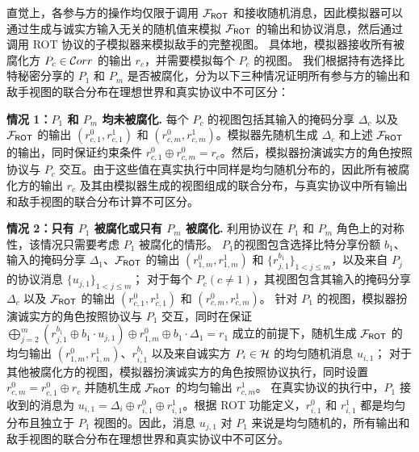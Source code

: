 \begin{trivlist}
直觉上，各参与方的操作均仅限于调用 $\mathcal{F}_\mathsf{ROT}$ 和接收随机消息，因此模拟器可以通过生成与诚实方输入无关的随机值来模拟 $\mathcal{F}_\mathsf{ROT}$ 的输出和协议消息，然后通过调用 ROT 协议的子模拟器来模拟敌手的完整视图。
具体地，模拟器接收所有被腐化方 $P_c \in \mathcal{C}orr$ 的输出 $r_c$，并需要模拟每个 $P_c$ 的视图。
我们根据持有选择比特秘密分享的 $P_1$ 和 $P_m$ 是否被腐化，分为以下三种情况证明所有参与方的输出和敌手视图的联合分布在理想世界和真实协议中不可区分：

\textbf{情况 1：$P_1$ 和 $P_m$ 均未被腐化.}
每个 $P_c$ 的视图包括其输入的掩码分享 $\Delta_c$ 以及 $\mathcal{F}_\mathsf{ROT}$ 的输出 $(r_{c,1}^0, r_{c,1}^1)$ 和 $(r_{c,m}^0, r_{c,m}^1)$。模拟器先随机生成 $\Delta_c$ 和上述 $\mathcal{F}_\mathsf{ROT}$ 的输出，同时保证约束条件 $r_{c,1}^0 \oplus r_{c,m}^0 = r_c$。然后，模拟器扮演诚实方的角色按照协议与 $P_c$ 交互。由于这些值在真实执行中同样是均匀随机分布的，因此所有被腐化方的输出 $r_c$ 及其由模拟器生成的视图组成的联合分布，与真实协议中所有输出和敌手视图的联合分布计算不可区分。

\textbf{情况 2：只有 $P_1$ 被腐化或只有 $P_m$ 被腐化.}
利用协议在 $P_1$ 和 $P_m$ 角色上的对称性，该情况只需要考虑 $P_1$ 被腐化的情形。
$P_1$的视图包含选择比特分享份额 $b_1$、输入的掩码分享 $\Delta_1$、$\mathcal{F}_\mathsf{ROT}$ 的输出 $(r_{1,m}^0, r_{1,m}^1)$ 和 $\{r_{j,1}^{b_1}\}_{1 < j \le m}$，以及来自 $P_j$ 的协议消息 $\{u_{j,1}\}_{1 < j \le m}$；
对于每个 $P_c (c \ne 1)$，其视图包含其输入的掩码分享 $\Delta_c$ 以及 $\mathcal{F}_\mathsf{ROT}$ 的输出 $(r_{c,1}^0, r_{c,1}^1)$ 和 $(r_{c,m}^0, r_{c,m}^1)$。
针对 $P_1$ 的视图，模拟器扮演诚实方的角色按照协议与 $P_1$ 交互，同时在保证 $\bigoplus_{j=2}^{m}(r_{j,1}^{b_1} \oplus b_1 \cdot u_{j,1}) \oplus r_{1,m}^0 \oplus b_1 \cdot \Delta_1 = r_1$ 成立的前提下，随机生成 $\mathcal{F}_\mathsf{ROT}$ 的均匀输出 $(r_{1,m}^0, r_{1,m}^1)$、$r_{i,1}^{b_1}$ 以及来自诚实方 $P_i \in \mathcal{H}$ 的均匀随机消息 $u_{i,1}$；
对于其他被腐化方的视图，模拟器扮演诚实方的角色按照协议执行，同时设置 $r_{c,m}^0 = r_{c,1}^0 \oplus r_c$ 并随机生成 $\mathcal{F}_\mathsf{ROT}$ 的均匀输出 $r_{c,m}^1$。
在真实协议的执行中，$P_1$ 接收到的消息为 $u_{i,1} = \Delta_i \oplus r_{i,1}^0 \oplus r_{i,1}^1$。根据 ROT 功能定义，$r_{i,1}^0$ 和 $r_{i,1}^1$ 都是均匀分布且独立于 $P_1$ 视图的。因此，消息 $u_{j,1}$ 对 $P_1$ 来说是均匀随机的，所有输出和敌手视图的联合分布在理想世界和真实协议中不可区分。


\end{trivlist}
